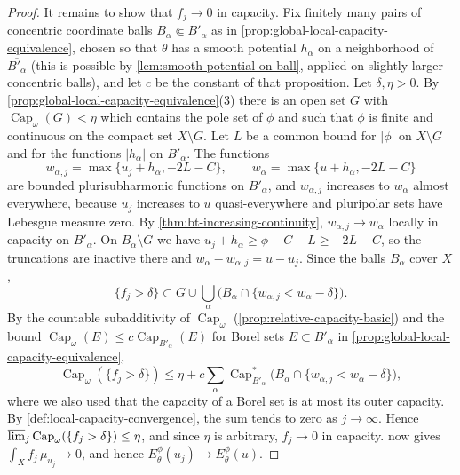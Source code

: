 \begin{proof}
It remains to show that $f_j\to0$ in capacity. Fix finitely many pairs of concentric coordinate balls $B_\alpha\Subset B'_\alpha$ as in \cref{prop:global-local-capacity-equivalence}, chosen so that $\theta$ has a smooth potential $h_\alpha$ on a neighborhood of $\overline{B'_\alpha}$ (this is possible by \cref{lem:smooth-potential-on-ball}, applied on slightly larger concentric balls), and let $c$ be the constant of that proposition. Let $\delta,\eta>0$. By \cref{prop:global-local-capacity-equivalence}(3) there is an open set $G$ with $\operatorname{Cap}_\omega(G)<\eta$ which contains the pole set of $\phi$ and such that $\phi$ is finite and continuous on the compact set $X\setminus G$. Let $L$ be a common bound for $|\phi|$ on $X\setminus G$ and for the functions $|h_\alpha|$ on $B'_\alpha$. The functions
\[
 w_{\alpha,j}=\max\{u_j+h_\alpha,-2L-C\},\qquad w_\alpha=\max\{u+h_\alpha,-2L-C\}
\]
are bounded plurisubharmonic functions on $B'_\alpha$, and $w_{\alpha,j}$ increases to $w_\alpha$ almost everywhere, because $u_j$ increases to $u$ quasi-everywhere and pluripolar sets have Lebesgue measure zero. By \cref{thm:bt-increasing-continuity}, $w_{\alpha,j}\to w_\alpha$ locally in capacity on $B'_\alpha$. On $B_\alpha\setminus G$ we have $u_j+h_\alpha\geq\phi-C-L\geq-2L-C$, so the truncations are inactive there and $w_\alpha-w_{\alpha,j}=u-u_j$. Since the balls $B_\alpha$ cover $X$,
\[
 \{f_j>\delta\}\subset G\cup\bigcup_\alpha\bigl(B_\alpha\cap\{w_{\alpha,j}<w_\alpha-\delta\}\bigr).
\]
By the countable subadditivity of $\operatorname{Cap}_\omega$ (\cref{prop:relative-capacity-basic}) and the bound $\operatorname{Cap}_\omega(E)\leq c\operatorname{Cap}_{B'_\alpha}(E)$ for Borel sets $E\subset B'_\alpha$ in \cref{prop:global-local-capacity-equivalence},
\[
 \operatorname{Cap}_\omega(\{f_j>\delta\})\leq\eta+c\sum_\alpha\operatorname{Cap}^*_{B'_\alpha}\bigl(\overline{B_\alpha}\cap\{w_{\alpha,j}<w_\alpha-\delta\}\bigr),
\]
where we also used that the capacity of a Borel set is at most its outer capacity. By \cref{def:local-capacity-convergence}, the sum tends to zero as $j\to\infty$. Hence $\varlimsup_j\operatorname{Cap}_\omega(\{f_j>\delta\})\leq\eta$, and since $\eta$ is arbitrary, $f_j\to0$ in capacity.  now gives $\int_Xf_j\,\mu_{u_j}\to0$, and hence $E_\theta^\phi(u_j)\to E_\theta^\phi(u)$.


\end{proof}
